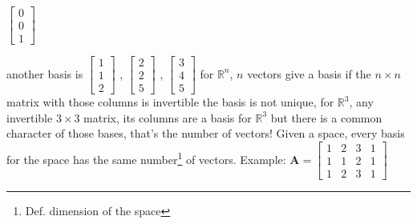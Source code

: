\documentclass[12pt, a4paper]{article}
\begin{document}
{\begin{math}
\begin{bmatrix}
		0 \\
		0 \\
		1 
	\end{bmatrix}
\end{math}
\par another basis is 
\begin{math}
	\begin{bmatrix}
		1 \\
		1 \\
		2 
	\end{bmatrix}
\end{math}
, 
\begin{math}
	\begin{bmatrix}
		2 \\
		2 \\
		5 
	\end{bmatrix}
\end{math}
, 
\begin{math}
	\begin{bmatrix}
		3 \\
		4 \\
		5 
	\end{bmatrix}
\end{math}
\vspace{14pt}
\newline
{\textcolor{anhao-purple}{for $\mathbb{R}^n$, $n$ vectors give a basis if the $n \times n$ matrix with those columns is invertible}}
\vspace{14pt}
\newline
{\textcolor{anhao-purple}{the basis is not unique, for $\mathbb{R}^3$, any invertible $3 \times 3$ matrix, its columns are a basis for $\mathbb{R}^3$}}
\vspace{14pt}
\newline
but there is a common character of those bases, that's the number of vectors!
\vspace{14pt}
\newline
{\textcolor{anhao-purple}{Given a space, every basis for the space has the same number\footnote{Def. dimension of the space} of vectors.}}
\vspace{14pt}
\newline
Example: 
\begin{math}
	{\mathbf{A}} = 
	\begin{bmatrix}
		1 & 2 & 3 & 1 \\
		1 & 1 & 2 & 1 \\
		1 & 2 & 3 & 1 
	\end{bmatrix}
\end{math}
}
\end{document}
